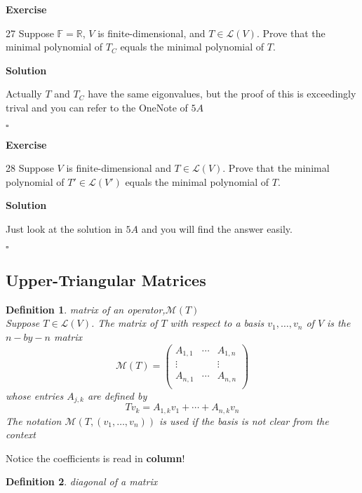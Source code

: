 \documentclass{article}
\newtheorem{definition}{Definition}[subsection]
\newenvironment{exercise}{%
{\textbf{Exercise\\}
    }
}{
}
\newenvironment{solution}{%
{
    \textbf{Solution\\}
    }
}{
  \hfill $\square$ 
  \par\bigskip 
}
\newcommand{\RR}{\mathbb{R}}
\newcommand{\FF}{\mathbb{F}}
\begin{document}
\begin{CJK}{UTF8}{gkai}
\begin{exercise}
    27 Suppose $\FF = \RR$, $V$  is finite-dimensional, and $T \in \mathcal{L}(V)$. Prove that the minimal polynomial of $T_C$ equals the minimal polynomial of $T$.

\end{exercise}

\begin{solution}
    Actually $T$ and $T_C$ have the same eigonvalues, but the proof of this is exceedingly trival and you can refer to the OneNote of $5A$
\end{solution}

\begin{exercise}
    28 Suppose $V$ is finite-dimensional and $T \in \mathcal{L}(V)$. Prove that the minimal polynomial of $T' \in \mathcal{L}(V ')$ equals the minimal polynomial of $T$.
\end{exercise}

\begin{solution}
    Just look at the solution in $5A$ and you will find the answer easily.
\end{solution}



\subsection{Upper-Triangular Matrices}

\begin{definition}
    matrix of an operator,$\mathcal{M}(T)$\\

 Suppose $T \in\mathcal{L}(V)$. The matrix of $T$ with respect to a basis $v_1,\ldots,v_n$ of $V$ is the $n-by-n$ matrix
    \[\mathcal{M}(T) = \begin{pmatrix}
        A_{1,1}&\cdots&A_{1,n}\\
        \vdots&&\vdots\\
        A_{n,1}&\cdots&A_{n,n}\\
    \end{pmatrix}\]
    whose entries $A_{j,k}$ are defined by
    \[Tv_k=A_{1,k}v_1+\cdots+A_{n,k}v_n\]
    The notation $\mathcal{M}(T,(v_1,\ldots,v_n))$ is used if the basis is not clear from the context
\end{definition}
Notice the coefficients is read in \textbf{column}!

\begin{definition}
    diagonal of a matrix\\


\end{definition}
\end{CJK}
\end{document}
